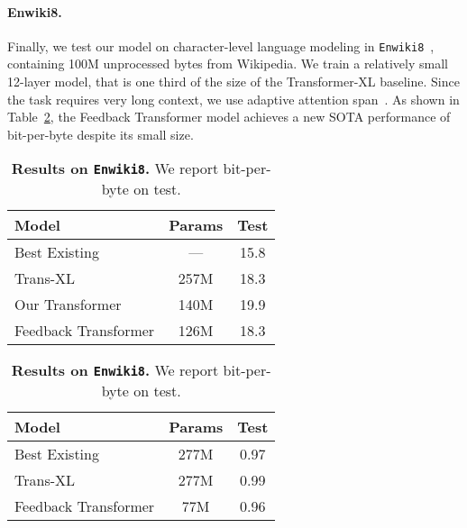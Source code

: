 \documentclass{article} \usepackage{iclr2021_conference}
\newcommand{\tab}[1]{Table~\ref{tab:#1}}
\begin{document}
\paragraph{Enwiki8.}
Finally, we test our model on  character-level language modeling in \texttt{Enwiki8}~\citep{mahoney2011large}, containing 100M unprocessed bytes from Wikipedia.
We train a relatively small 12-layer model, that is one third of the size of the Transformer-XL baseline.
Since the task requires very long context, we use adaptive attention span~\citep{sukhbaatar2019adaptive}.
As shown in \tab{enwik8}, the Feedback Transformer model achieves a new SOTA performance of  bit-per-byte despite its small size. 

\begin{table}
	\begin{minipage}[t]{.48\textwidth}
	\centering
	    \begin{tabular}{l@{}cc}
	    \toprule
	    Model & Params & Test\\
	    \midrule
	    Best Existing~\footnotesize{\citep{roy2020efficient}} & --- & 15.8 \\ 
	    Trans-XL ~\footnotesize{\citep{dai2019transformer}} & 257M & 18.3 \\ 
	    \midrule 
	    Our Transformer & 140M  & 19.9 \\
	    Feedback Transformer & 126M  & 18.3 \\ 
	    \bottomrule
	    \end{tabular}
	    \caption{
	        \textbf{Results on \texttt{WikiText-103}.}
	        We report perplexity on test.
		}
	    \label{tab:wikitext103}
	\end{minipage}
	\hfill
	\begin{minipage}[t]{.48\textwidth}
		\setlength{\tabcolsep}{2.8pt}
		    \centering
		    \begin{tabular}{lcc}
		    \toprule
		    Model & Params & Test\\
		    \midrule
		    Best Existing~\footnotesize{\citep{rae2020compressive}} & 277M & 0.97 \\
		    Trans-XL ~\footnotesize{\citep{dai2019transformer}} & 277M  & 0.99 \\
		    \midrule 
		    Feedback Transformer & 77M  & 0.96 \\  
		    \bottomrule
		    \end{tabular}
		    \caption{
		    \textbf{Results on \texttt{Enwiki8}.} We report bit-per-byte on test.
		    }
		    \label{tab:enwik8}
	\end{minipage}
\end{table}
\end{document}
